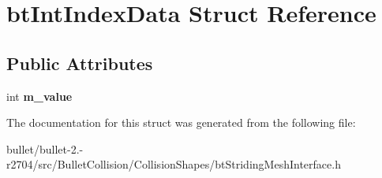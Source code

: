\hypertarget{structbt_int_index_data}{\section{bt\+Int\+Index\+Data Struct Reference}
\label{structbt_int_index_data}
}
\subsection*{Public Attributes}
\begin{DoxyCompactItemize}
\item 
\hypertarget{structbt_int_index_data_afcfedba4aedfa132e0d3d4b206d334e8}{int {\bfseries m\+\_\+value}}\label{structbt_int_index_data_afcfedba4aedfa132e0d3d4b206d334e8}

\end{DoxyCompactItemize}


The documentation for this struct was generated from the following file\+:\begin{DoxyCompactItemize}
\item 
bullet/bullet-\/2.-\/r2704/src/\+Bullet\+Collision/\+Collision\+Shapes/bt\+Striding\+Mesh\+Interface.\+h\end{DoxyCompactItemize}
